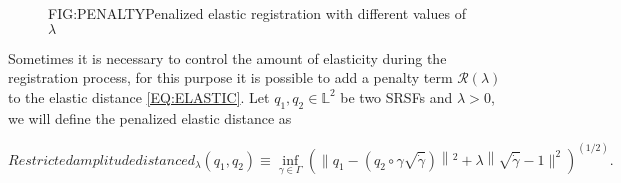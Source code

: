
\begin{figure}[Penalized elastic registration]{FIG:PENALTY}{Penalized elastic registration with different values of $\lambda$}
	 \quad
\end{figure}

Sometimes it is necessary to control the amount of elasticity during the
registration process, for this purpose it is possible to add a penalty term
$\mathcal{R}(\lambda)$ to the elastic distance \ref{EQ:ELASTIC}.
Let $q_1, q_2 \in \mathbb{L}^2$ be two SRSFs and $\lambda > 0$, we will define
the penalized elastic distance as

\begin{equation}[]{Restricted amplitude distance}
d_{\lambda}\left(q_{1}, q_{2}\right) \equiv \inf _{\gamma \in \Gamma}\left(
\| q_{1}-\left(q_{2} \circ \gamma \sqrt{\dot{\gamma}}\right)\left\|^{2}+
\lambda\right\| \sqrt{\dot{\gamma}}-1 \|^{2} \right)^{(1 / 2)}.
\end{equation}



